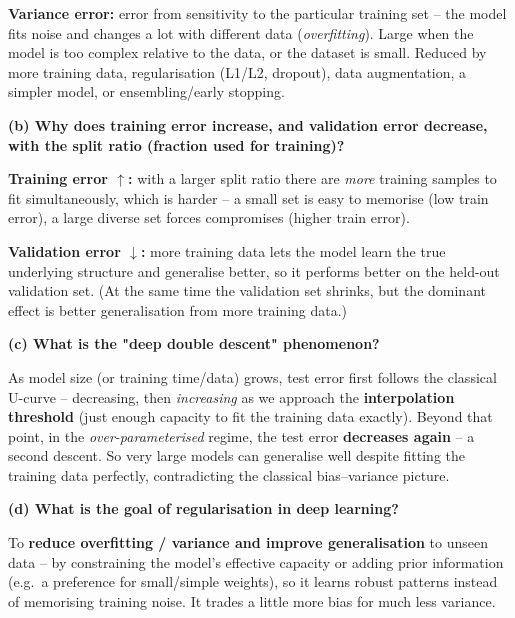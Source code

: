 \documentclass[10pt,a4paper]{article}
\begin{document}
\begin{enumerate}[leftmargin=*,label=\textbf{Q\arabic*.}]
\begin{answerbox}
\textbf{Variance error:} error from sensitivity to the particular training set -- the model fits noise and changes a lot with different data (\emph{overfitting}). Large when the model is too complex relative to the data, or the dataset is small. Reduced by more training data, regularisation (L1/L2, dropout), data augmentation, a simpler model, or ensembling/early stopping.
\end{answerbox}

\textbf{(b) Why does training error increase, and validation error decrease, with the split ratio (fraction used for training)?}
\begin{answerbox}
\textbf{Training error $\uparrow$:} with a larger split ratio there are \emph{more} training samples to fit simultaneously, which is harder -- a small set is easy to memorise (low train error), a large diverse set forces compromises (higher train error).

\textbf{Validation error $\downarrow$:} more training data lets the model learn the true underlying structure and generalise better, so it performs better on the held-out validation set. (At the same time the validation set shrinks, but the dominant effect is better generalisation from more training data.)
\end{answerbox}

\textbf{(c) What is the "deep double descent" phenomenon?}
\begin{answerbox}
As model size (or training time/data) grows, test error first follows the classical U-curve -- decreasing, then \emph{increasing} as we approach the \textbf{interpolation threshold} (just enough capacity to fit the training data exactly). Beyond that point, in the \emph{over-parameterised} regime, the test error \textbf{decreases again} -- a second descent. So very large models can generalise well despite fitting the training data perfectly, contradicting the classical bias--variance picture.
\end{answerbox}

\textbf{(d) What is the goal of regularisation in deep learning?}
\begin{answerbox}
To \textbf{reduce overfitting / variance and improve generalisation} to unseen data -- by constraining the model's effective capacity or adding prior information (e.g.\ a preference for small/simple weights), so it learns robust patterns instead of memorising training noise. It trades a little more bias for much less variance.
\end{answerbox}


\end{enumerate}
\end{document}
